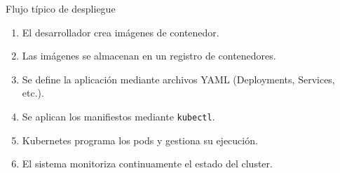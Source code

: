 \documentclass{beamer}
\begin{document}
\begin{frame}{Flujo típico de despliegue}
\begin{enumerate}
\item El desarrollador crea imágenes de contenedor.
\item Las imágenes se almacenan en un registro de contenedores.
\item Se define la aplicación mediante archivos YAML (Deployments, Services, etc.).
\item Se aplican los manifiestos mediante \texttt{kubectl}.
\item Kubernetes programa los pods y gestiona su ejecución.
\item El sistema monitoriza continuamente el estado del cluster.
\end{enumerate}
\end{frame}
\end{document}

